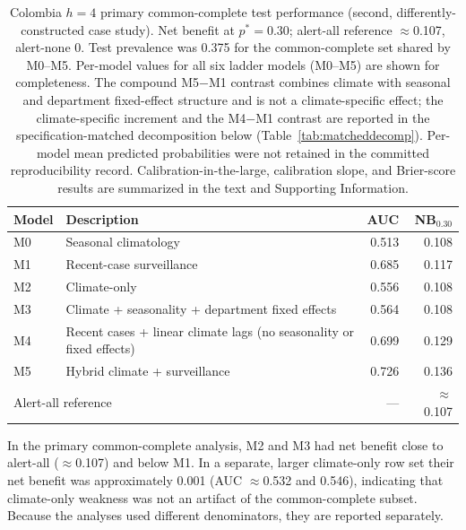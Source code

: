 \documentclass[11pt,a4paper]{article}
\begin{document}
\begin{table}[htbp]
\centering
\caption{Colombia $h=4$ primary common-complete test performance (second, differently-constructed case study). Net benefit at $p^*=0.30$; alert-all reference $\approx$0.107, alert-none $0$. Test prevalence was 0.375 for the common-complete set shared by M0--M5. Per-model values for all six ladder models (M0--M5) are shown for completeness. The compound M5$-$M1 contrast combines climate with seasonal and department fixed-effect structure and is not a climate-specific effect; the climate-specific increment and the M4$-$M1 contrast are reported in the specification-matched decomposition below (Table~\ref{tab:matcheddecomp}). Per-model mean predicted probabilities were not retained in the committed reproducibility record. Calibration-in-the-large, calibration slope, and Brier-score results are summarized in the text and Supporting Information.}
\label{tab:colombia}
\small
\begin{tabular}{llrr}
\toprule
Model & Description & AUC & NB$_{0.30}$ \\
\midrule
M0 & Seasonal climatology & 0.513 & 0.108 \\
M1 & Recent-case surveillance & 0.685 & 0.117 \\
M2 & Climate-only & 0.556 & 0.108 \\
M3 & Climate + seasonality + department fixed effects & 0.564 & 0.108 \\
M4 & Recent cases + linear climate lags (no seasonality or fixed effects) & 0.699 & 0.129 \\
M5 & Hybrid climate + surveillance & 0.726 & 0.136 \\
\midrule
\multicolumn{2}{l}{Alert-all reference} & --- & $\approx$0.107 \\
\bottomrule
\end{tabular}
\end{table}

\noindent In the primary common-complete analysis, M2 and M3 had net benefit close to alert-all ($\approx$0.107) and below M1. In a separate, larger climate-only row set their net benefit was approximately 0.001 (AUC $\approx$0.532 and 0.546), indicating that climate-only weakness was not an artifact of the common-complete subset. Because the analyses used different denominators, they are reported separately.
\end{document}
